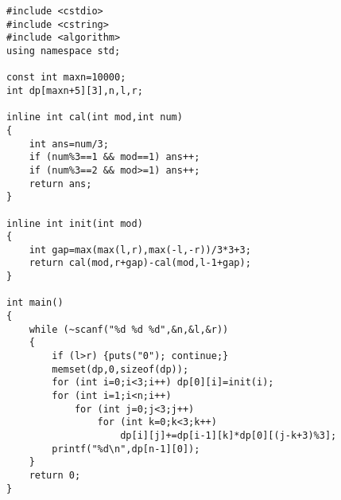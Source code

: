 \documentclass{article}
\begin{document}

\begin{lstlisting}
#include <cstdio>
#include <cstring>
#include <algorithm>
using namespace std;

const int maxn=10000;
int dp[maxn+5][3],n,l,r;

inline int cal(int mod,int num)
{
    int ans=num/3;
    if (num%3==1 && mod==1) ans++;
    if (num%3==2 && mod>=1) ans++;
    return ans;
}

inline int init(int mod)
{
    int gap=max(max(l,r),max(-l,-r))/3*3+3;
    return cal(mod,r+gap)-cal(mod,l-1+gap);
}

int main()
{
    while (~scanf("%d %d %d",&n,&l,&r))
    {
        if (l>r) {puts("0"); continue;}
        memset(dp,0,sizeof(dp));
        for (int i=0;i<3;i++) dp[0][i]=init(i);
        for (int i=1;i<n;i++)
            for (int j=0;j<3;j++)
                for (int k=0;k<3;k++)
                    dp[i][j]+=dp[i-1][k]*dp[0][(j-k+3)%3];
        printf("%d\n",dp[n-1][0]);
    }
    return 0;
}
\end{lstlisting}
\end{document}
